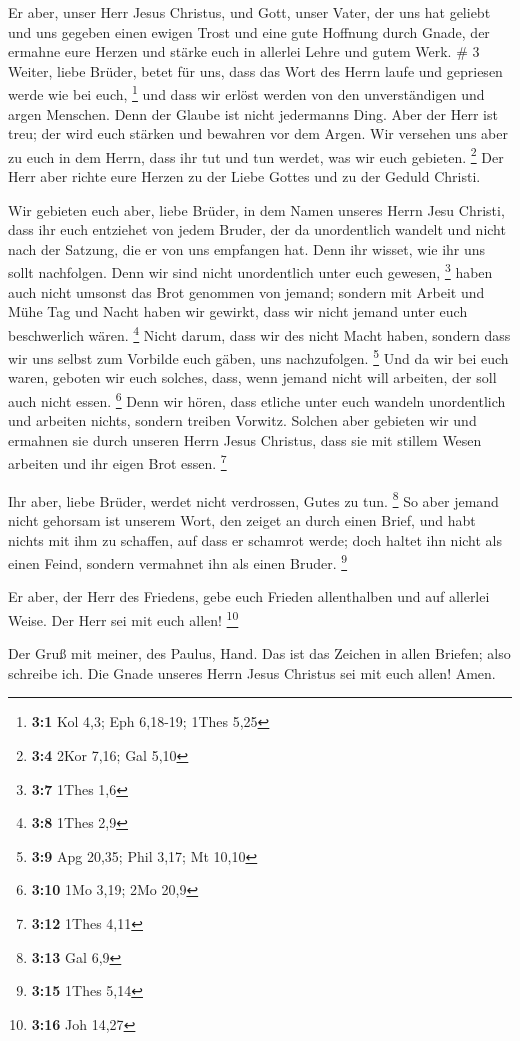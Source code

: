  Er aber, unser Herr Jesus Christus, und Gott, unser Vater,
der uns hat geliebt und uns gegeben einen ewigen Trost und eine gute
Hoffnung durch Gnade,  der ermahne eure Herzen und stärke
euch in allerlei Lehre und gutem Werk. \# 3  Weiter, liebe
Brüder, betet für uns, dass das Wort des Herrn laufe und gepriesen werde
wie bei euch, \footnote{\textbf{3:1} Kol 4,3; Eph 6,18-19; 1Thes 5,25}
 und dass wir erlöst werden von den unverständigen und argen
Menschen. Denn der Glaube ist nicht jedermanns Ding.  Aber
der Herr ist treu; der wird euch stärken und bewahren vor dem Argen.
 Wir versehen uns aber zu euch in dem Herrn, dass ihr tut
und tun werdet, was wir euch gebieten. \footnote{\textbf{3:4} 2Kor 7,16;
  Gal 5,10}  Der Herr aber richte eure Herzen zu der Liebe
Gottes und zu der Geduld Christi.

 Wir gebieten euch aber, liebe Brüder, in dem Namen unseres
Herrn Jesu Christi, dass ihr euch entziehet von jedem Bruder, der da
unordentlich wandelt und nicht nach der Satzung, die er von uns
empfangen hat.  Denn ihr wisset, wie ihr uns sollt
nachfolgen. Denn wir sind nicht unordentlich unter euch gewesen,
\footnote{\textbf{3:7} 1Thes 1,6}  haben auch nicht umsonst
das Brot genommen von jemand; sondern mit Arbeit und Mühe Tag und Nacht
haben wir gewirkt, dass wir nicht jemand unter euch beschwerlich wären.
\footnote{\textbf{3:8} 1Thes 2,9}  Nicht darum, dass wir des
nicht Macht haben, sondern dass wir uns selbst zum Vorbilde euch gäben,
uns nachzufolgen. \footnote{\textbf{3:9} Apg 20,35; Phil 3,17; Mt 10,10}
 Und da wir bei euch waren, geboten wir euch solches, dass,
wenn jemand nicht will arbeiten, der soll auch nicht essen. \footnote{\textbf{3:10}
  1Mo 3,19; 2Mo 20,9}  Denn wir hören, dass etliche unter
euch wandeln unordentlich und arbeiten nichts, sondern treiben Vorwitz.
 Solchen aber gebieten wir und ermahnen sie durch unseren
Herrn Jesus Christus, dass sie mit stillem Wesen arbeiten und ihr eigen
Brot essen. \footnote{\textbf{3:12} 1Thes 4,11}

 Ihr aber, liebe Brüder, werdet nicht verdrossen, Gutes zu
tun. \footnote{\textbf{3:13} Gal 6,9}  So aber jemand nicht
gehorsam ist unserem Wort, den zeiget an durch einen Brief, und habt
nichts mit ihm zu schaffen, auf dass er schamrot werde; 
doch haltet ihn nicht als einen Feind, sondern vermahnet ihn als einen
Bruder. \footnote{\textbf{3:15} 1Thes 5,14}

 Er aber, der Herr des Friedens, gebe euch Frieden
allenthalben und auf allerlei Weise. Der Herr sei mit euch allen!
\footnote{\textbf{3:16} Joh 14,27}

 Der Gruß mit meiner, des Paulus, Hand. Das ist das Zeichen
in allen Briefen; also schreibe ich.  Die Gnade unseres
Herrn Jesus Christus sei mit euch allen! Amen.
